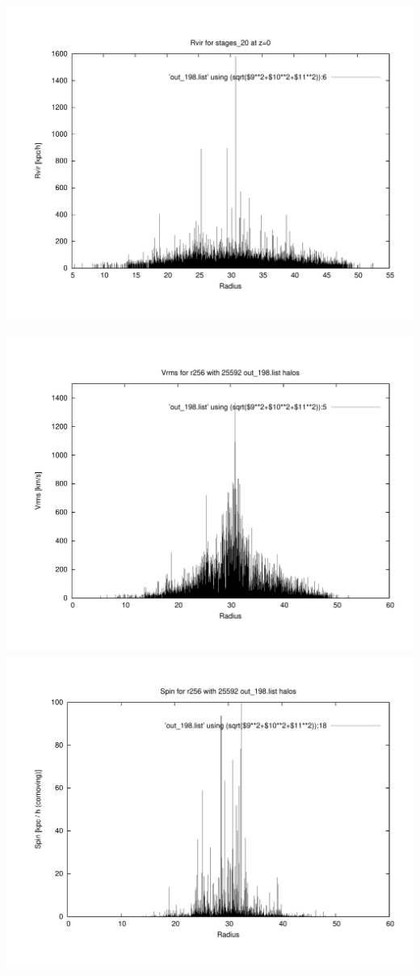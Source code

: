 \includegraphics[scale=0.3]{stages_20/plot_rvir_z0.pdf}

\includegraphics[scale=0.3]{stages_20/plot_Vrms_out_198.pdf}
\includegraphics[scale=0.3]{stages_20/plot_spin_out_198.pdf}

